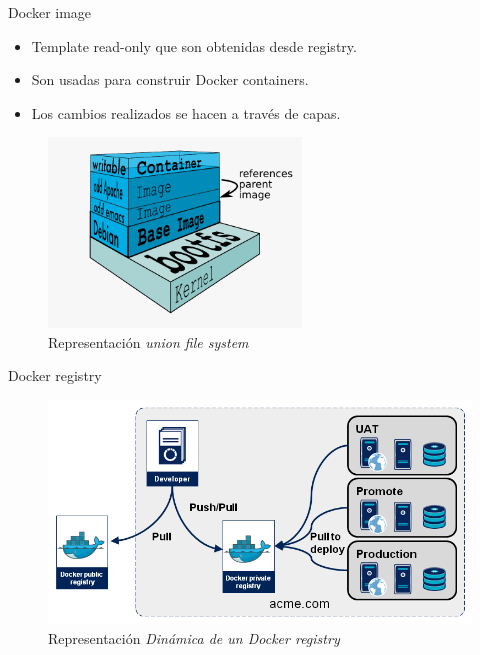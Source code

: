 \documentclass{bredelebeamer}
\begin{document}
    
\begin{frame}{Docker image}
\begin{itemize}
	\item Template read-only que son obtenidas desde registry.
	\item Son usadas para construir Docker containers.
	\item Los cambios realizados se hacen a través de capas.
\end{itemize}
\begin{figure}[H]
  \centering
  \includegraphics[width=0.6\textwidth]{images/docker-filesystems-multilayer}
    \caption{Representación \textit{union file system}}
    \label{fig:arquitectura}
\end{figure}	
\end{frame}

\begin{frame}{Docker registry}

\begin{figure}[H]
  \centering
  \includegraphics[width=\textwidth,height=0.8\textheight,keepaspectratio]{images/registry-dynamic.png}
    \caption{Representación \textit{Dinámica de un \textit{Docker registry} }}
    \label{fig:dynamic}
\end{figure}	
\end{frame}
\end{document}
